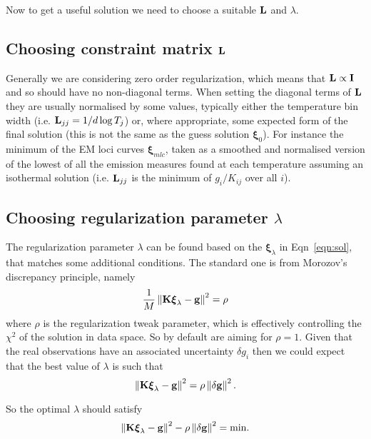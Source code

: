 \documentclass[12pt,a4paper]{article}
\begin{document}
Now to get a useful solution we need to choose a suitable ${\bf L}$ and $\lambda$.

\newpage
\vspace{-10pt}
\subsection*{Choosing constraint matrix ${\bf L}$}

Generally we are considering zero order regularization, which means that ${\bf L} \propto {\bf I}$ and so should have no non-diagonal terms. When setting the diagonal terms of ${\bf L}$ they are usually normalised by some values, typically either the temperature bin width (i.e. ${\bf L}_{jj}=1/d \log T_j$) or, where appropriate, some expected form of the final solution (this is not the same as the guess solution $\boldsymbol{\xi}_0$). For instance the minimum of the EM loci curves $\boldsymbol{\xi}_{mlc}$, taken as a smoothed and normalised version of the lowest of all the emission measures found at each temperature assuming an isothermal solution (i.e. ${\bf L}_{jj}$ is the minimum of $g_i/K_{ij}$ over all $i$).


\vspace{-10pt}
\subsection*{Choosing regularization parameter $\lambda$}

The regularization parameter $\lambda$ can be found based on the $\boldsymbol{\xi}_\lambda$ in Eqn~\ref{eqn:sol}, that matches some additional conditions. The standard one is from Morozov's discrepancy principle, namely
\begin{equation}
    \frac{1}{M}\left\|\bf{K\boldsymbol{\xi}_\lambda-g}\right\|^2  =  \rho
\end{equation}
where $\rho$ is the regularization tweak parameter, which is effectively controlling the $\chi^2$ of the solution in data space. So by default are aiming for $\rho=1$. Given that the real observations have an associated uncertainty $\delta g_i$ then we could expect that the best value of $\lambda$ is such that 
\begin{equation}
    \left\|\bf{K\boldsymbol{\xi}_\lambda-g}\right\|^2  =  \rho \left\| {\bf \delta g}\right\|^2 .
\end{equation}

So the optimal $\lambda$ should satisfy 
\begin{equation}\label{eqn:desc}
    \left\|\bf{K\boldsymbol{\xi}_\lambda-g}\right\|^2  -  \rho \left\| {\bf \delta g}\right\|^2 = \mathrm{min}.
\end{equation}
\end{document}
